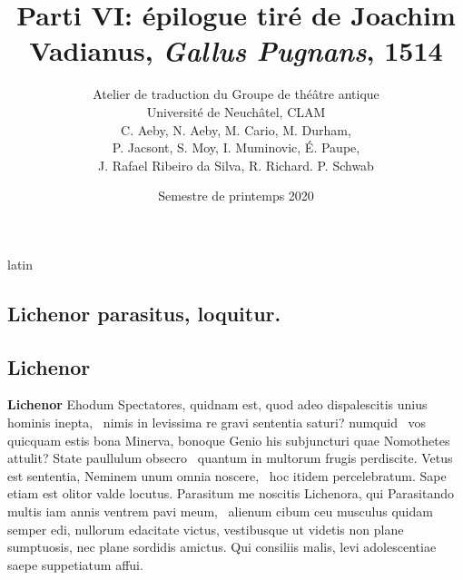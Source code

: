 \documentclass[12pt]{book}
\renewenvironment{latin}
    	{\begin{hyphenrules}{latin}}
    	{\end{hyphenrules}}
\begin{document}
        \title{Parti VI: épilogue tiré de Joachim Vadianus, \textit{Gallus Pugnans}, 1514}
        \author{Atelier de traduction du Groupe de théâtre antique\\
            Université de Neuchâtel, CLAM\\
            C. Aeby, N. Aeby, M. Cario, M. Durham,\\ 
            P. Jacsont, S. Moy, I. Muminovic, É. Paupe,\\
            J. Rafael Ribeiro da Silva, R. Richard. P. Schwab}
        \date{Semestre de printemps 2020}
        
        \maketitle
        \begin{pages}
        \begin{latin}
        \begin{Leftside}
        \beginnumbering 
            \pstart\section*{Lichenor parasitus, loquitur.}\pend\pstart\subsection*{Lichenor}\pend\pstart\textbf{Lichenor}\hspace{1cm} 
                        Ehodum Spectatores, quidnam est, quod adeo dispalescitis unius hominis inepta, ﻿\ampersand\ nimis in levissima re gravi sententia saturi? 
                        numquid ﻿\ampersand\ vos quicquam estis bona Minerva, bonoque Genio his subjuncturi quae Nomothetes attulit? 
                        State paullulum   obsecro ﻿\ampersand\ quantum in multorum  frugis  perdiscite. 
                        Vetus est sententia, Neminem unum omnia noscere, ﻿\ampersand\ hoc itidem percelebratum. 
                        Sape etiam est olitor valde  locutus. 
                        Parasitum me noscitis Lichenora, 
                        qui Parasitando multis iam annis ventrem pavi meum, ﻿\ampersand\ alienum cibum ceu musculus quidam semper edi, 
                        nullorum edacitate  victus, 
                        vestibusque ut videtis non plane sumptuosis, nec plane sordidis amictus. 
                        Qui consiliis  malis, levi adolescentiae saepe suppetiatum affui. 

\end{Leftside}
\end{latin}
\end{pages}
\end{document}
